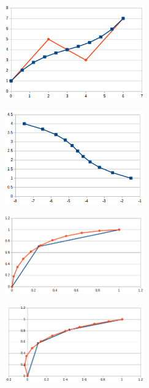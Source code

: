 \documentclass[12pt, a4paper]{article}
\begin{document}
\begin{center}
\begin{figure}[H]
\centering\includegraphics[width=6cm]{./res.png}\\
\end{figure}
\end{center}
\begin{center}
\begin{figure}[H]
\centering\includegraphics[width=6cm]{./resrot.png}\\
\end{figure}
\end{center}
\begin{center}
\begin{figure}[H]
\centering\includegraphics[width=6cm]{./cloud1.png}\\
\end{figure}
\end{center}
\begin{center}
\begin{figure}[H]
\centering\includegraphics[width=6cm]{./cloud2.png}\\
\end{figure}
\end{center}
\end{document}
